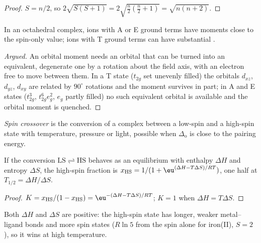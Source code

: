\begin{proof}
$S = n/2$, so $2\sqrt{S(S+1)} = 2\sqrt{\frac n2(\frac n2 + 1)} = \sqrt{n(n+2)}$.
\end{proof}

\begin{proposition}\label{prop:b3:complex-spectra-magnetism:orbital-contribution}
In an octahedral complex, ions with A or E ground terms have moments close to the
spin-only value; ions with T ground terms can have substantial .
\end{proposition}

\begin{proof}[Argued]
An orbital moment needs an orbital that can be turned into an equivalent,
degenerate one by a rotation about the field axis, with an electron free to
move between them. In a T state ($t_{2g}$ set unevenly filled) the orbitals $d_{xz}$, $d_{yz}$, $d_{xy}$
are related by $90^\circ$ rotations and the moment survives in part; in A and E states
($t_{2g}^3$, $t_{2g}^6e_g^2$, $e_g$ partly filled) no such equivalent orbital is available and the
orbital moment is quenched.
\end{proof}

\begin{definition}\label{def:b3:complex-spectra-magnetism:spin-crossover}
\emph{Spin crossover} is the conversion of a complex between
a low-spin and a high-spin state with temperature, pressure or light, possible
when $\Delta_{\mathrm o}$ is close to the pairing energy.
\end{definition}

\begin{proposition}\label{prop:b3:complex-spectra-magnetism:crossover}
If the conversion $\mathrm{LS} \rightleftharpoons \mathrm{HS}$ behaves as an equilibrium with enthalpy $\Delta H$ and entropy $\Delta S$, the
high-spin fraction is $x_{\mathrm{HS}} = 1/(1 + \eu^{(\Delta H - T\Delta S)/RT})$, one half at $T_{1/2} = \Delta H/\Delta S$.
\end{proposition}

\begin{proof}
$K = x_{\mathrm{HS}}/(1 - x_{\mathrm{HS}}) = \eu^{-(\Delta H - T\Delta S)/RT}$; $K = 1$ when $\Delta H = T\Delta S$.
\end{proof}

Both $\Delta H$ and $\Delta S$ are positive: the high-spin state has longer, weaker metal--ligand
bonds and more spin states ($R\ln5$ from the spin alone for iron(II), $S = 2$), so it wins at
high temperature.

